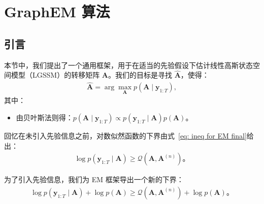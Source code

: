 
\chapter{GraphEM 算法}

\section{引言}

本节中，我们提出了一个通用框架，用于在适当的先验假设下估计线性高斯状态空间模型（LGSSM）的转移矩阵 \(\mathbf{A}\)。我们的目标是寻找 \(\widehat{\mathbf{A}}\)，使得：
\begin{align}
    \widehat{\mathbf{A}} = \arg \max_{\mathbf{A}} p(\mathbf{A} \mid \mathbf{y}_{1:T}), \label{eq: GraphEM argmax}
\end{align}
其中：
\begin{itemize}
    \item 由贝叶斯法则得：\(p(\mathbf{A} \mid \mathbf{y}_{1:T}) \propto p(\mathbf{y}_{1:T} \mid \mathbf{A}) p(\mathbf{A})\)。
\end{itemize}

回忆在未引入先验信息之前，对数似然函数的下界由式~\eqref{eq: ineq for EM final}给出：
\begin{align}
    \log p(\mathbf{y}_{1:T} \mid \mathbf{A}) \ge \mathcal{Q}(\mathbf{A}, \mathbf{A}^{(n)})。
\end{align}

为了引入先验信息，我们为 EM 框架导出一个新的下界：
\begin{align}
    \log p(\mathbf{y}_{1:T} \mid \mathbf{A}) + \log p(\mathbf{A}) \ge \mathcal{Q}(\mathbf{A}, \mathbf{A}^{(n)}) + \log p(\mathbf{A})。 \label{eq: ineq for GraphEM}
\end{align}

